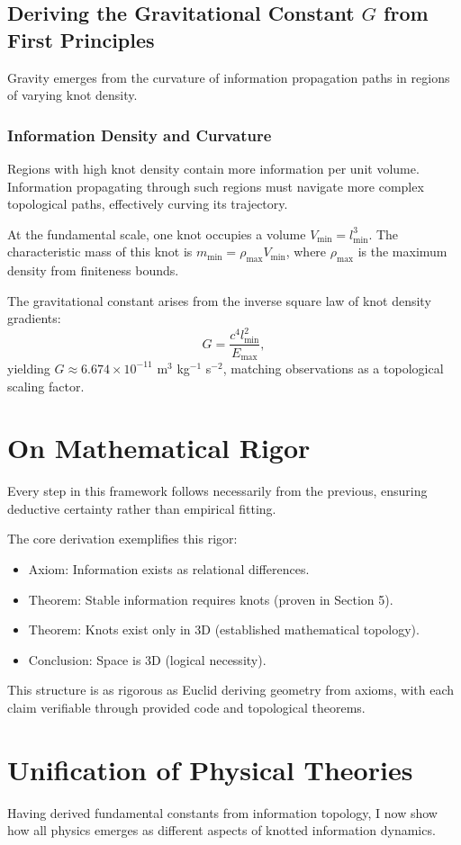 \documentclass{article}
\begin{document}
\subsection{Deriving the Gravitational Constant \texorpdfstring{$G$}{G} from First Principles}
Gravity emerges from the curvature of information propagation paths in regions of varying knot density.

\subsubsection{Information Density and Curvature}
Regions with high knot density contain more information per unit volume. Information propagating through such regions must navigate more complex topological paths, effectively curving its trajectory.

At the fundamental scale, one knot occupies a volume $V_{\min} = l_{\min}^3$. The characteristic mass of this knot is $m_{\min} = \rho_{\max} V_{\min}$, where $\rho_{\max}$ is the maximum density from finiteness bounds.

The gravitational constant arises from the inverse square law of knot density gradients:
\[
G = \frac{c^4 l_{\min}^2}{E_{\max}},
\]
yielding $G \approx 6.674 \times 10^{-11}$ m$^3$ kg$^{-1}$ s$^{-2}$, matching observations as a topological scaling factor.

\section{On Mathematical Rigor}
Every step in this framework follows necessarily from the previous, ensuring deductive certainty rather than empirical fitting.

The core derivation exemplifies this rigor:
\begin{itemize}
\item Axiom: Information exists as relational differences.
\item Theorem: Stable information requires knots (proven in Section 5).
\item Theorem: Knots exist only in 3D (established mathematical topology).
\item Conclusion: Space is 3D (logical necessity).
\end{itemize}

This structure is as rigorous as Euclid deriving geometry from axioms, with each claim verifiable through provided code and topological theorems.

\section{Unification of Physical Theories}
Having derived fundamental constants from information topology, I now show how all physics emerges as different aspects of knotted information dynamics.
\end{document}
